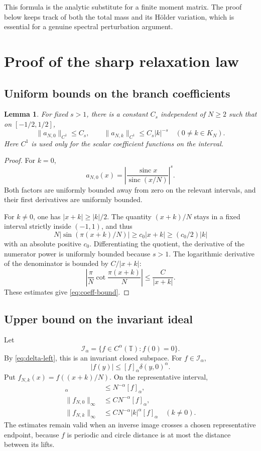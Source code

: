 \documentclass[11pt,a4paper]{article}
\numberwithin{equation}{section}
\newtheorem{lemma}[lemma]{Lemma}
\theoremstyle{definition}
\theoremstyle{remark}
\newcommand{\TT}{\mathbb T}
\newcommand{\sinc}{\operatorname{sinc}}
\begin{document}
This formula is the analytic substitute for a finite moment matrix.
The proof below keeps track of both the total mass and its H\"older
variation, which is essential for a genuine spectral perturbation argument.

\section{Proof of the sharp relaxation law}
\label{sec:relax-proof}

\subsection{Uniform bounds on the branch coefficients}
\begin{lemma}
\label{lem:coeff}
For fixed $s>1$, there is a constant $C_s$ independent of $N\ge2$ such
that on $[-1/2,1/2]$,
\begin{equation}
 \|a_{N,0}\|_{C^1}\le C_s,\qquad
 \|a_{N,k}\|_{C^1}\le C_s|k|^{-s}\quad(0\ne k\in K_N).
 \label{eq:coeff-bound}
\end{equation}
Here $C^1$ is used only for the scalar coefficient functions on the
interval.
\end{lemma}
\begin{proof}
For $k=0$,
\[
 a_{N,0}(x)=\left|\frac{\sinc x}{\sinc(x/N)}\right|^s.
\]
Both factors are uniformly bounded away from zero on the relevant
intervals, and their first derivatives are uniformly bounded.

For $k\ne0$, one has $|x+k|\ge|k|/2$. The quantity
$(x+k)/N$ stays in a fixed interval strictly inside $(-1,1)$, and thus
\[
 N|\sin(\pi(x+k)/N)|\ge c_0|x+k|\ge(c_0/2)|k|
\]
with an absolute positive $c_0$. Differentiating the quotient, the derivative
of the numerator power is uniformly bounded because $s>1$. The logarithmic
derivative of the denominator is bounded by $C/|x+k|$:
\[
 \left|\frac{\pi}{N}\cot\frac{\pi(x+k)}N\right|
 \le\frac{C}{|x+k|}.
\]
These estimates give \cref{eq:coeff-bound}.
\end{proof}

\subsection{Upper bound on the invariant ideal}
Let
\[
 \mathcal I_\alpha=\{f\in C^\alpha(\TT):f(0)=0\}.
\]
By \cref{eq:delta-left}, this is an invariant closed subspace. For
$f\in\mathcal I_\alpha$,
\begin{equation}
 |f(y)|\le[f]_\alpha\delta(y,0)^\alpha.
 \label{eq:vanishing-bound}
\end{equation}
Put $f_{N,k}(x)=f((x+k)/N)$. On the representative interval,
\begin{align}
 [f_{N,k}]_\alpha&\le N^{-\alpha}[f]_\alpha,\\
 \|f_{N,0}\|_\infty&\le C N^{-\alpha}[f]_\alpha,\\
 \|f_{N,k}\|_\infty&\le C N^{-\alpha}|k|^\alpha[f]_\alpha
 \quad(k\ne0).
 \label{eq:branch-f}
\end{align}
The estimates remain valid when an inverse image crosses a chosen
representative endpoint, because $f$ is periodic and circle distance is
at most the distance between its lifts.
\end{document}

